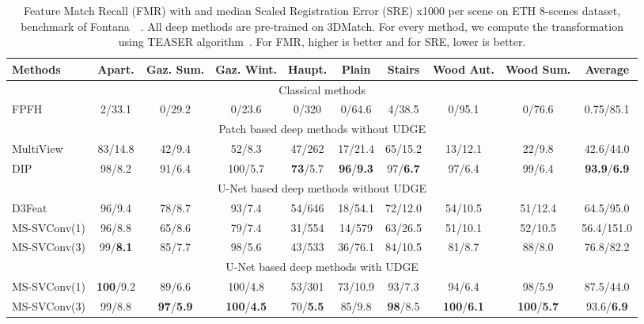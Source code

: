 \documentclass[10pt,twocolumn,letterpaper]{article}
\begin{document}
\begin{table*}[ht]
\small
\centering
\begin{tabular}[t]{lccccccccc}
\toprule
Methods & Apart. & Gaz. Sum. & Gaz. Wint. & Haupt. & Plain & Stairs & Wood Aut. & Wood Sum. & Average \\
\midrule
\multicolumn{10}{c}{Classical methods} \\
FPFH~\cite{rusu_fast_2009} &2/33.1&0/29.2&0/23.6&0/320&0/64.6&4/38.5&0/95.1&0/76.6&0.75/85.1 \\
\midrule
\multicolumn{10}{c}{Patch based deep methods without UDGE}\\
MultiView~\cite{Li_2020_CVPR} & 83/14.8 & 42/9.4 & 52/8.3 & 47/262 & 17/21.4 & 65/15.2 & 13/12.1 & 22/9.8 &42.6/44.0\\
DIP~\cite{Poiesi2021} & 98/8.2 & 91/6.4 & 100/5.7 & \textbf{73}/5.7 & \textbf{96}/\textbf{9.3} & 97/\textbf{6.7} & 97/6.4 & 99/6.4 & \textbf{93.9}/\textbf{6.9} \\
\midrule
\multicolumn{10}{c}{U-Net based deep methods without UDGE} \\
D3Feat~\cite{bai2020d3feat} & 96/9.4 & 78/8.7 & 93/7.4 & 54/646 & 18/54.1 & 72/12.0 & 54/10.5 & 51/12.4 &64.5/95.0\\
MS-SVConv(1) & 96/8.8 & 65/8.6 & 79/7.4 & 31/554 & 14/579 & 63/26.5 & 51/10.1 & 52/10.5&56.4/151.0 \\
MS-SVConv(3) & 99/\textbf{8.1} & 85/7.7 & 98/5.6 & 43/533 & 36/76.1 & 84/10.5 & 81/8.7 & 88/8.0 & 76.8/82.2\\
\midrule
\multicolumn{10}{c}{U-Net based deep methods with UDGE} \\
MS-SVConv(1) & \textbf{100}/9.2 & 89/6.6 & 100/4.8 & 53/301 & 73/10.9 & 93/7.3 & 94/6.4 & 98/5.9 &87.5/44.0 \\
MS-SVConv(3) & 99/8.8 & \textbf{97}/\textbf{5.9} & \textbf{100}/\textbf{4.5} & 70/\textbf{5.5} & 85/9.8 & \textbf{98}/8.5 & \textbf{100}/\textbf{6.1} & \textbf{100}/\textbf{5.7} & 93.6/\textbf{6.9} \\
\bottomrule
\end{tabular}
\caption{Feature Match Recall (FMR) with  and median Scaled Registration Error (SRE) x1000 per scene on ETH 8-scenes dataset, benchmark of Fontana~\etal~\cite{fontana2020benchmark}. All deep methods are pre-trained on 3DMatch. For every method, we compute the transformation using TEASER algorithm~\cite{yang2020teaser}. For FMR, higher is better and for SRE, lower is better.}
\label{tab:ethfontana}
\end{table*}
\end{document}
